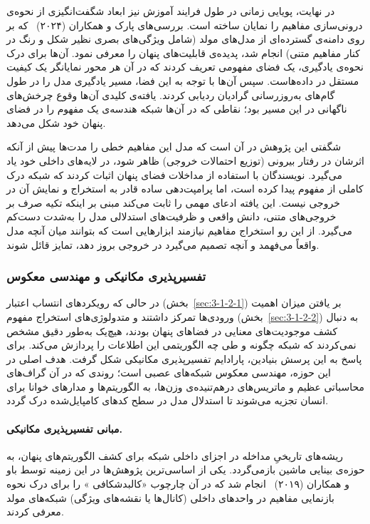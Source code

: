 در نهایت، پویایی زمانی در طول فرایند آموزش نیز ابعاد شگفت‌انگیزی از نحوه‌ی درونی‌سازی مفاهیم را نمایان ساخته است. بررسی‌های پارک و همکاران (۲۰۲۴)~\cite{park2024emergence} که بر روی دامنه‌ی گسترده‌ای از مدل‌های مولد (شامل ویژگی‌های بصری نظیر شکل و رنگ در کنار مفاهیم متنی) انجام شد، پدیده‌ی قابلیت‌های پنهان را معرفی نمود. آن‌ها برای درک نحوه‌ی یادگیری، یک فضای مفهومی تعریف کردند که در آن هر محور نمایانگر یک کیفیت مستقل در داده‌هاست. سپس آن‌ها با توجه به این فضا، مسیر یادگیری مدل را در طول گام‌های به‌روزرسانی گرادیان ردیابی کردند. یافته‌ی کلیدی آن‌ها وقوع چرخش‌های ناگهانی در این مسیر بود؛ نقاطی که در آن‌ها شبکه هندسه‌ی یک مفهوم را در فضای پنهان خود شکل می‌دهد.

شگفتی این پژوهش در آن است که مدل این مفاهیم خطی را مدت‌ها پیش از آنکه اثرشان در رفتار بیرونی (توزیع احتمالات خروجی) ظاهر شود، در لایه‌های داخلی خود یاد می‌گیرد. نویسندگان با استفاده از مداخلات فضای پنهان اثبات کردند که شبکه درک کاملی از مفهوم پیدا کرده است، اما پرامپت‌دهی ساده قادر به استخراج و نمایش آن در خروجی نیست. این یافته ادعای مهمی را ثابت می‌کند مبنی بر اینکه تکیه صرف بر خروجی‌های متنی، دانش واقعی و ظرفیت‌های استدلالی مدل را به‌شدت دست‌کم می‌گیرد. از این رو استخراج مفاهیم نیازمند ابزارهایی است که بتوانند میان آنچه مدل واقعاً می‌فهمد و آنچه تصمیم می‌گیرد در خروجی بروز دهد، تمایز قائل شوند.


\subsubsection{تفسیرپذیری مکانیکی و مهندسی معکوس}\label{sec:3-1-2-3}

در حالی که رویکردهای انتساب اعتبار (بخش~\ref{sec:3-1-2-1}) بر یافتن میزان اهمیت ورودی‌ها تمرکز داشتند و متدولوژی‌های استخراج مفهوم (بخش~\ref{sec:3-1-2-2}) به دنبال کشف موجودیت‌های معنایی در فضاهای پنهان بودند، هیچ‌یک به‌طور دقیق مشخص نمی‌کردند که شبکه چگونه و طی چه الگوریتمی این اطلاعات را پردازش می‌کند. برای پاسخ به این پرسش بنیادین، پارادایم تفسیرپذیری مکانیکی شکل گرفت. هدف اصلی در این حوزه، مهندسی معکوس شبکه‌های عصبی است؛ روندی که در آن گراف‌های محاسباتی عظیم و ماتریس‌های درهم‌تنیده‌ی وزن‌ها، به الگوریتم‌ها و مدارهای خوانا برای انسان تجزیه می‌شوند تا استدلال مدل در سطح کدهای کامپایل‌شده درک گردد.

\paragraph{مبانی تفسیرپذیری مکانیکی.}

ریشه‌های تاریخیِ مداخله در اجزای داخلی شبکه برای کشف الگوریتم‌های پنهان، به حوزه‌ی بینایی ماشین بازمی‌گردد. یکی از اساسی‌ترین پژوهش‌ها در این زمینه توسط باو و همکاران (۲۰۱۹)~\cite{bau2018visualizing} انجام شد که در آن چارچوب «کالبدشکافی » را برای درک نحوه بازنمایی مفاهیم در واحدهای داخلی (کانال‌ها یا نقشه‌های ویژگی) شبکه‌های مولد معرفی کردند. 

